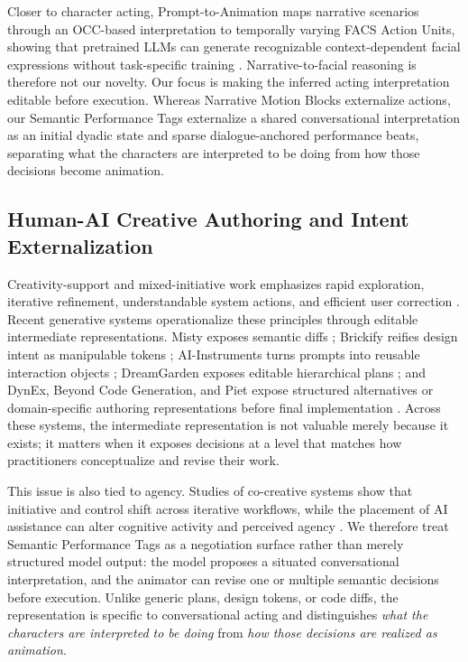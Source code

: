 Closer to character acting, Prompt-to-Animation maps narrative scenarios through an OCC-based interpretation to temporally varying FACS Action Units, showing that pretrained LLMs can generate recognizable context-dependent facial expressions without task-specific training \cite{durupinar2025prompt}. Narrative-to-facial reasoning is therefore not our novelty. Our focus is making the inferred acting interpretation editable before execution. Whereas Narrative Motion Blocks externalize actions, our Semantic Performance Tags externalize a shared conversational interpretation as an initial dyadic state and sparse dialogue-anchored performance beats, separating what the characters are interpreted to be doing from how those decisions become animation.

\subsection{Human-AI Creative Authoring and Intent Externalization}

Creativity-support and mixed-initiative work emphasizes rapid exploration, iterative refinement, understandable system actions, and efficient user correction \cite{shneiderman2007creativity,horvitz1999mixed,amershi2019guidelines}. Recent generative systems operationalize these principles through editable intermediate representations. Misty exposes semantic diffs \cite{lu2025misty}; Brickify reifies design intent as manipulable tokens \cite{shi2025brickify}; AI-Instruments turns prompts into reusable interaction objects \cite{riche2025ai}; DreamGarden exposes editable hierarchical plans \cite{earle2025dreamgarden}; and DynEx, Beyond Code Generation, and Piet expose structured alternatives or domain-specific authoring representations before final implementation \cite{ma2025dynex,zamfirescu2025beyond,shi2024piet}. Across these systems, the intermediate representation is not valuable merely because it exists; it matters when it exposes decisions at a level that matches how practitioners conceptualize and revise their work.

This issue is also tied to agency. Studies of co-creative systems show that initiative and control shift across iterative workflows, while the placement of AI assistance can alter cognitive activity and perceived agency \cite{wan2024secondmind,zhou2024nonlinear,xu2025productive}. We therefore treat Semantic Performance Tags as a negotiation surface rather than merely structured model output: the model proposes a situated conversational interpretation, and the animator can revise one or multiple semantic decisions before execution. Unlike generic plans, design tokens, or code diffs, the representation is specific to conversational acting and distinguishes \emph{what the characters are interpreted to be doing} from \emph{how those decisions are realized as animation}.
